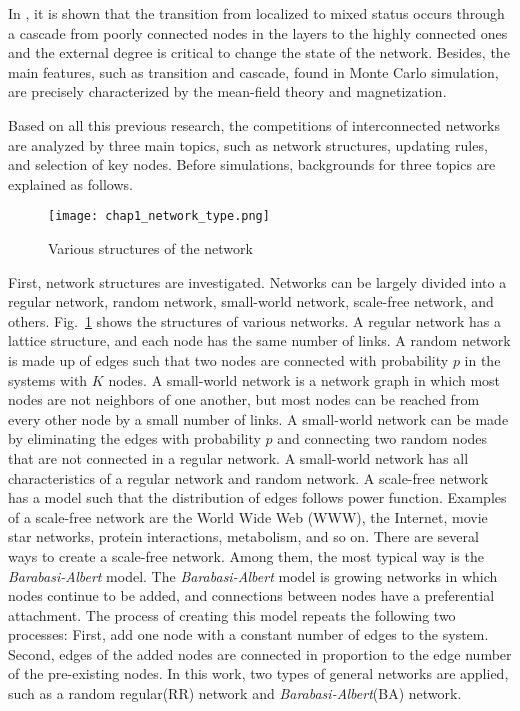 In \parencite{gomez2015}, it is shown that the transition from localized to mixed status occurs through a cascade from poorly connected nodes in the layers to the highly connected ones and the external degree is critical to change the state of the network. Besides, the main features, such as transition and cascade, found in Monte Carlo simulation, are precisely characterized by the mean-field theory and magnetization\parencite{alvarez2016, diep2017, amato2017, gomez2015}. 

Based on all this previous research, the competitions of interconnected networks are analyzed by three main topics, such as network structures, updating rules, and selection of key nodes. Before simulations, backgrounds for three topics are explained as follows. 
\begin{figure}[!htb]
	\centering
	\texttt{[image: chap1\_network\_type.png]}
	\caption{Various structures of the network}
	\label{chap1_network_type}
\end{figure}
First, network structures are investigated. Networks can be largely divided into a regular network, random network\parencite{erdos1960}, small-world network\parencite{watts1998}, scale-free network\parencite{barabasi1999}, and others. Fig.~\ref{chap1_network_type} shows the structures of various networks. A regular network has a lattice structure, and each node has the same number of links. A random network is made up of edges such that two nodes are connected with probability $p$ in the systems with $K$ nodes. A small-world network is a network graph in which most nodes are not neighbors of one another, but most nodes can be reached from every other node by a small number of links. A small-world network can be made by eliminating the edges with probability $p$ and connecting two random nodes that are not connected in a regular network. A small-world network has all characteristics of a regular network and random network. A scale-free network has a model such that the distribution of edges follows power function. Examples of a scale-free network are the World Wide Web (WWW), the Internet, movie star networks, protein interactions, metabolism, and so on. There are several ways to create a scale-free network. Among them, the most typical way is the \textit{Barabasi-Albert} model. The \textit{Barabasi-Albert} model is growing networks in which nodes continue to be added, and connections between nodes have a preferential attachment. The process of creating this model repeats the following two processes: First, add one node with a constant number of edges to the system. Second, edges of the added nodes are connected in proportion to the edge number of the pre-existing nodes. In this work, two types of general networks are applied, such as a random regular(RR) network and \textit{Barabasi-Albert}(BA) network. 


